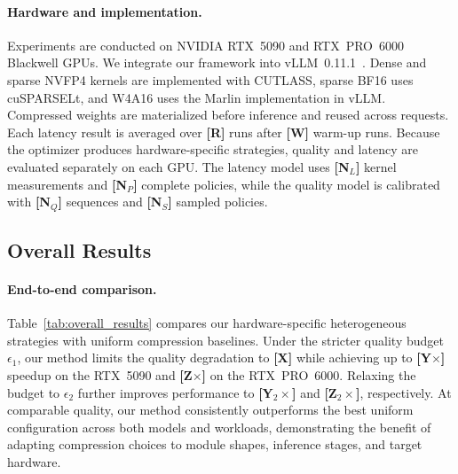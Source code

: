 \documentclass[letterpaper]{article} %
\begin{document}
\paragraph{Hardware and implementation.}
Experiments are conducted on NVIDIA RTX~5090 and RTX~PRO~6000 Blackwell GPUs. We integrate our framework into vLLM~0.11.1~\cite{kwon2023vllm}. Dense and sparse NVFP4 kernels are implemented with CUTLASS, sparse BF16 uses cuSPARSELt, and W4A16 uses the Marlin implementation in vLLM. Compressed weights are materialized before inference and reused across requests. Each latency result is averaged over \textbf{[R]} runs after \textbf{[W]} warm-up runs. Because the optimizer produces hardware-specific strategies, quality and latency are evaluated separately on each GPU. The latency model uses \textbf{[N$_L$]} kernel measurements and \textbf{[N$_P$]} complete policies, while the quality model is calibrated with \textbf{[N$_Q$]} sequences and \textbf{[N$_S$]} sampled policies.

\subsection{Overall Results}



\paragraph{End-to-end comparison.}
Table~\ref{tab:overall_results} compares our hardware-specific heterogeneous strategies with uniform compression baselines. Under the stricter quality budget $\epsilon_1$, our method limits the quality degradation to \textbf{[X]} while achieving up to \textbf{[Y$\times$]} speedup on the RTX~5090 and \textbf{[Z$\times$]} on the RTX~PRO~6000. Relaxing the budget to $\epsilon_2$ further improves performance to \textbf{[Y$_2\times$]} and \textbf{[Z$_2\times$]}, respectively. At comparable quality, our method consistently outperforms the best uniform configuration across both models and workloads, demonstrating the benefit of adapting compression choices to module shapes, inference stages, and target hardware.
\end{document}

